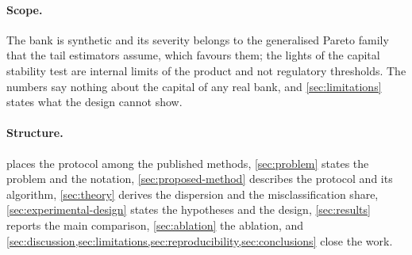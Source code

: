 \paragraph{Scope.} The bank is synthetic and its severity belongs to the generalised Pareto family that the tail estimators assume, which favours them; the lights of the capital stability test are internal limits of the product and not regulatory thresholds. The numbers say nothing about the capital of any real bank,
and \cref{sec:limitations} states what the design cannot show.

\paragraph{Structure.}  places the protocol among the published methods, \cref{sec:problem} states the problem and the notation, \cref{sec:proposed-method} describes the protocol and its algorithm, \cref{sec:theory} derives the dispersion and the misclassification share,
\cref{sec:experimental-design} states the hypotheses and the design, \cref{sec:results} reports the main comparison, \cref{sec:ablation} the ablation, and \cref{sec:discussion,sec:limitations,sec:reproducibility,sec:conclusions} close the work.
